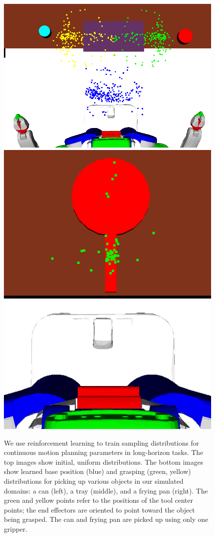 \begin{figure}[t]
    \includegraphics[scale=0.13]{images/dinner_tray_final.png}
    \includegraphics[scale=0.13]{images/frying_final.png}
  \caption{\small{We use reinforcement learning to train sampling distributions for
      continuous motion planning parameters in long-horizon tasks. The top images show
      initial, uniform distributions. The bottom images show learned base position (blue) and
      grasping (green, yellow) distributions for picking up various objects in our simulated domains:
      a can (left), a tray (middle), and a frying pan (right).
      The green and yellow points refer to the positions of the tool center points;
      the end effectors are oriented to point toward the object being grasped. The can and
      frying pan are picked up using only one gripper.}}
  \label{fig:cover}
\end{figure}

